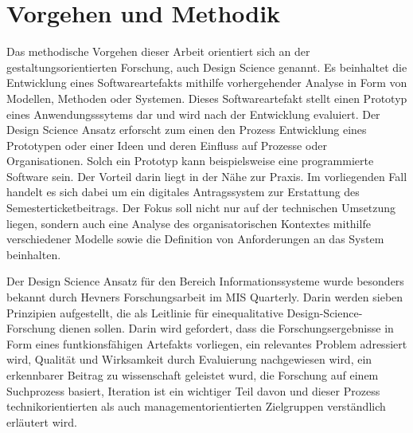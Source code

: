 
\chapter{Vorgehen und Methodik}\label{cha:Methodik}

Das methodische Vorgehen dieser Arbeit orientiert sich an der gestaltungsorientierten Forschung, auch \glqq{}Design Science\grqq{} genannt. Es beinhaltet die Entwicklung eines Softwareartefakts mithilfe vorhergehender Analyse in Form von Modellen, Methoden oder Systemen. Dieses Softwareartefakt stellt einen Prototyp eines Anwendungsssytems dar und wird nach der Entwicklung evaluiert.  
Der Design Science Ansatz erforscht zum einen den Prozess Entwicklung eines Prototypen oder einer Ideen und deren Einfluss auf Prozesse oder Organisationen. Solch ein Prototyp kann beispielsweise eine programmierte Software sein. Der Vorteil darin liegt in der Nähe zur Praxis.  Im vorliegenden Fall handelt es sich dabei um ein digitales Antragssystem zur Erstattung des Semesterticketbeitrags. Der Fokus soll nicht nur auf der technischen Umsetzung liegen, sondern auch eine Analyse des organisatorischen Kontextes mithilfe verschiedener Modelle sowie die Definition von Anforderungen an das System beinhalten. 

Der Design Science Ansatz für den Bereich Informationssysteme wurde besonders bekannt durch Hevners Forschungsarbeit im \glqq{}MIS Quarterly\grqq{}.  Darin werden sieben Prinzipien aufgestellt, die als Leitlinie für einequalitative Design-Science-Forschung dienen sollen. Darin wird gefordert, dass die Forschungsergebnisse in Form eines funtkionsfähigen Artefakts vorliegen, ein relevantes Problem adressiert wird, Qualität und Wirksamkeit durch Evaluierung nachgewiesen wird, ein erkennbarer Beitrag zu wissenschaft geleistet wurd, die Forschung auf einem Suchprozess basiert, Iteration ist ein wichtiger Teil davon und dieser Prozess technikorientierten als auch managementorientierten Zielgruppen verständlich erläutert wird. 

